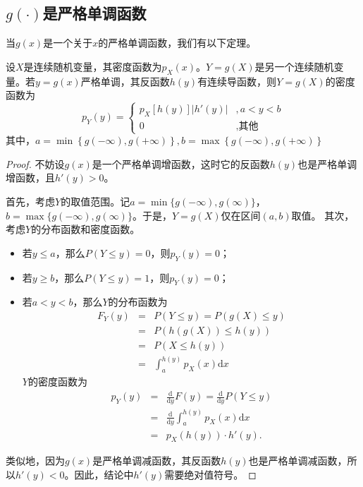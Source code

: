 \subsection{$g(\cdot)$是严格单调函数}
当$g(x)$是一个关于$x$的严格单调函数，我们有以下定理。
\begin{theorem}\label{thm:rv_transform}
    设$X$是连续随机变量，其密度函数为$p_{X}(x)$。$Y=g(X)$是另一个连续随机变量。若$y=g(x)$严格单调，其反函数$h(y)$有连续导函数，则$Y=g(X)$的密度函数为
    $$p_{Y}(y)=\left\{\begin{aligned}
    p_{X}\left [ h(y) \right ]\left | h'(y) \right |  &,a<y<b \\
    0&,\text{其他}\end{aligned}\right.$$
    其中，$a=\min\left \{ g(-\infty ),g(+\infty ) \right \} ,b=\max\left \{ g(-\infty ),g(+\infty ) \right \}$
    \end{theorem}
    \begin{proof}
    不妨设$g(x)$是一个严格单调增函数，这时它的反函数$h(y)$也是严格单调增函数，且$h'(y)>0$。

    首先，考虑$Y$的取值范围。记$a = \min\{g(-\infty),g(\infty)\}$，$b = \max\{g(-\infty),g(\infty)\}$。于是，$Y=g(X)$仅在区间$(a,b)$取值。
    其次，考虑$Y$的分布函数和密度函数。
    \begin{itemize}
        \item 若$y\leq a$，那么$P(Y\leq y) = 0$，则$p_Y(y) = 0$；
        \item  若$y\geq b$，那么$P(Y\leq y) = 1$，则$p_Y(y) = 0$；
        \item 若$a< y<b$，那么$Y$的分布函数为
        \begin{eqnarray*}
        F_Y(y) &=& P(Y \leq y) = P(g(X) \leq y ) \\
        &=& P(h(g(X)) \leq h(y)) \\
        &=& P(X \leq h(y)) \\
        &=& \int_{a}^{h(y)} p_X(x) \text{d}x 
        \end{eqnarray*}
        $Y$的密度函数为
        \begin{eqnarray*}
            p_Y(y) &=& \frac{\text{d} }{\text{d} y} F(y)= \frac{\text{d} }{\text{d} y} P(Y\leq y) \\
            &=& \frac{\text{d} }{\text{d} y}\int_{a}^{h(y)} p_X(x) \text{d}x \\
            &=& p_X(h(y)) \cdot h'(y).
        \end{eqnarray*}
    \end{itemize}
    类似地，因为$g(x)$是严格单调减函数，其反函数$h(y)$也是严格单调减函数，所以$h'(y)<0$。因此，结论中$h'(y)$需要绝对值符号。
    \end{proof}
